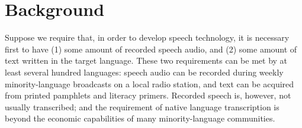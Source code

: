 \section{Background}

Suppose we require that, in
order to develop speech technology, it is necessary first to have (1)
some amount of recorded speech audio, and (2) some amount of text
written in the target language.  These two requirements can be met by
at least several hundred languages: speech audio can be recorded
during weekly minority-language broadcasts on a local radio station,
and text can be acquired from printed pamphlets and literacy primers.
Recorded speech is, however, not usually transcribed; and the
requirement of native language transcription is beyond the economic
capabilities of many minority-language communities.
